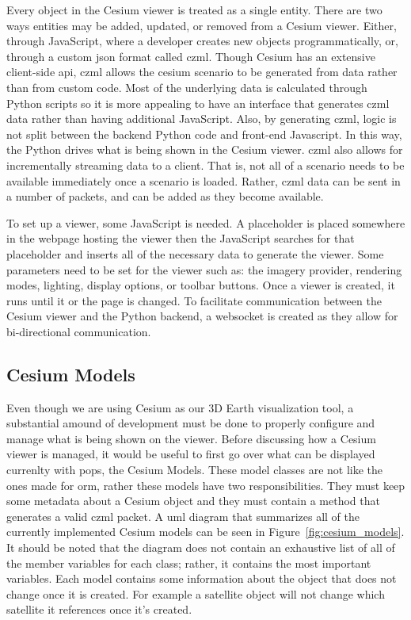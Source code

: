Every object in the Cesium viewer is treated as a single entity. There are two
ways entities may be added, updated, or removed from a Cesium viewer. Either,
through JavaScript, where a developer creates new objects programmatically, or,
through a custom \gls{json} format called \gls{czml}. Though Cesium has an
extensive client-side \gls{api}, \gls{czml} allows the cesium scenario to be
generated from data rather than from custom code. Most of the underlying data
is calculated through Python scripts so it is more appealing to have an
interface that generates \gls{czml} data rather than having additional
JavaScript. Also, by generating \gls{czml}, logic is not split between the
backend Python code and front-end Javascript. In this way, the Python drives
what is being shown in the Cesium viewer. \gls{czml} also allows for
incrementally streaming data to a client. That is, not all of a scenario needs
to be available immediately once a scenario is loaded. Rather, \gls{czml} data
can be sent in a number of packets, and can be added as they become available.

To set up a viewer, some JavaScript is needed. A placeholder is placed
somewhere in the webpage hosting the viewer then the JavaScript searches for
that placeholder and inserts all of the necessary data to generate the viewer.
Some parameters need to be set for the viewer such as: the imagery provider,
rendering modes, lighting, display options, or toolbar buttons. Once a viewer
is created, it runs until it or the page is changed.  To facilitate
communication between the Cesium viewer and the Python backend, a websocket is
created as they allow for bi-directional communication. 

\subsection{Cesium Models}\label{sec:cesium-models}

Even though we are using Cesium as our 3D Earth visualization tool, a
substantial amound of development must be done to properly configure and manage
what is being shown on the viewer. Before discussing how a Cesium viewer is
managed, it would be useful to first go over what can be displayed currenlty
with \gls{pops}, the Cesium Models. These model classes are not like the ones
made for \gls{orm}, rather these models have two responsibilities. They must
keep some metadata about a Cesium object and they must contain a method that
generates a valid \gls{czml} packet.  A \gls{uml} diagram that summarizes all
of the currently implemented Cesium models can be seen in
Figure~\ref{fig:cesium_models}. It should be noted that the diagram does not
contain an exhaustive list of all of the member variables for each class;
rather, it contains the most important variables.  Each model contains some
information about the object that does not change once it is created. For
example a satellite object will not change which satellite it references once
it's created. 

